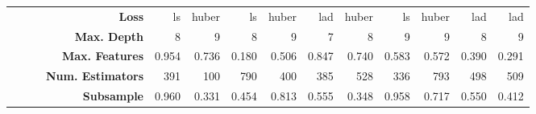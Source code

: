 \begin{tabular*}{\textwidth}{cccr|@{\extracolsep{\fill}}rrrrrrrrrr}
     &    &   & \textbf{Loss} &  ls &  huber &  ls &  huber &  lad &  huber &  ls &  huber &  lad &  lad \\
     &    &   & \textbf{Max. Depth} &  8 &  9 &  8 &  9 &  7 &  8 &  9 &  9 &  8 &  9 \\
     &    &   & \textbf{Max. Features} &  0.954 &  0.736 &  0.180 &  0.506 &  0.847 &  0.740 &  0.583 &  0.572 &  0.390 &  0.291 \\
     &    &   & \textbf{Num. Estimators} &  391 &  100 &  790 &  400 &  385 &  528 &  336 &  793 &  498 &  509 \\
     &    &   & \textbf{Subsample} &  0.960 &  0.331 &  0.454 &  0.813 &  0.555 &  0.348 &  0.958 &  0.717 &  0.550 &  0.412 \\
\bottomrule
\end{tabular*}
